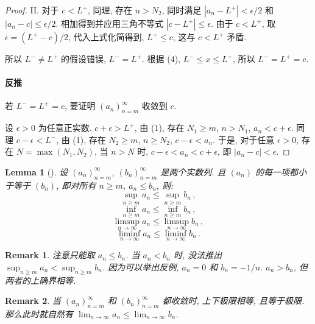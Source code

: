 \documentclass[UTF8]{ctexart}
\theoremstyle{mystyle}
\newtheorem{lemma}{Lemma}[section]
\theoremstyle{myremark}
\newtheorem*{remark}{Remark}
\theoremstyle{plain}
\begin{document}
\begin{proof}
    II. 对于 $ c < L^+ $, 同理, 存在 $ n > N_2 $, 同时满足 $ |a_n - L^+| < \epsilon / 2 $ 和 $ |a_n - c| \leqslant \epsilon / 2 $. 相加得到并应用三角不等式 $ |c - L^+| \leqslant \epsilon $. 由于 $ c < L^+ $, 取 $ \epsilon = (L^+ - c) / 2 $, 代入上式化简得到, $ L^+ \leqslant c $, 这与 $ c < L^+ $ 矛盾.

    所以 $ L^- \neq L^+ $ 的假设错误, $ L^- = L^+ $. 根据 (4), $ L^- \leqslant x \leqslant L^+ $, 所以 $ L^- = L^+ = c $.

    \paragraph{反推}
    若 $ L^- = L^+ = c $, 要证明 $ (a_n)_{n = m}^\infty $ 收敛到 $ c $.

    设 $ \epsilon > 0 $ 为任意正实数. $ c + \epsilon > L^+ $, 由 (1), 存在 $ N_1 \geqslant m $, $ n > N_1 $, $ a_n < c + \epsilon $. 同理 $ c - \epsilon < L^- $, 由 (1), 存在 $ N_2 \geqslant m $, $ n \geqslant N_2 $, $ c - \epsilon < a_n $. 于是, 对于任意 $ \epsilon > 0 $, 存在 $ N = \max (N_1, N_2) $, 当 $ n > N $ 时, $ c - \epsilon < a_n < c + \epsilon $, 即 $ |a_n - c| < \epsilon $.
\end{proof}

\begin{lemma}[]
    设 $ (a_n)_{n = m}^\infty $, $ (b_n)_{n = m}^\infty $ 是两个实数列. 且 $ (a_n) $ 的每一项都小于等于 $ (b_n) $, 即对所有 $ n \geqslant m $, $ a_n \leqslant b_n $, 则:
    \[ \sup_{n \geqslant m} a_n \leqslant \sup_{n \geqslant m} b_n \,,\]
    \[ \inf_{n \geqslant m} a_n \leqslant \inf_{n \geqslant m} b_n \,,\]
    \[ \limsup_{n \to \infty} a_n \leqslant \limsup_{n \to \infty} b_n \,,\]
    \[ \liminf_{n \to \infty} a_n \leqslant \liminf_{n \to \infty} b_n \,.\]
\end{lemma}

\begin{remark}
    注意只能取 $ a_n \leqslant b_n $. 当 $ a_n < b_n $ 时, 没法推出 $ \displaystyle \sup_{n \geqslant m} a_n < \sup_{n \geqslant m} b_n $. 因为可以举出反例, $ a_n = 0 $ 和 $ b_n = -1/n $. $ a_n > b_n $, 但两者的上确界相等.
\end{remark}

\begin{remark}
    当 $ (a_n)_{n = m}^\infty $ 和 $ (b_n)_{n = m}^\infty $ 都收敛时, 上下极限相等, 且等于极限. 那么此时就自然有 $ \displaystyle \lim_{n \to \infty} a_n \leqslant \lim_{n \to \infty} b_n $.
\end{remark}
\end{document}
